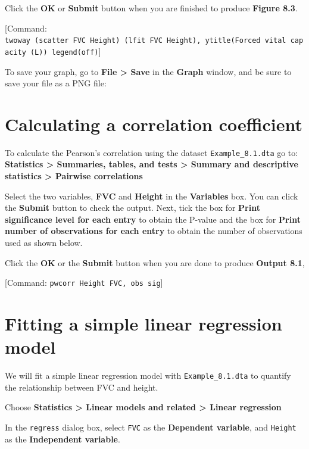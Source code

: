 \documentclass[
]{memoir}
\begin{document}
Click the \textbf{OK} or \textbf{Submit} button when you are finished to produce \textbf{Figure 8.3}.

{[}Command: \texttt{twoway\ (scatter\ FVC\ Height)\ (lfit\ FVC\ Height),\ ytitle(Forced\ vital\ capacity\ (L))\ legend(off)}{]}

To save your graph, go to \textbf{File \textgreater{} Save} in the \textbf{Graph} window, and be sure to save your file as a PNG file:

\hypertarget{calculating-a-correlation-coefficient}{%
\section{Calculating a correlation coefficient}\label{calculating-a-correlation-coefficient}}

To calculate the Pearson's correlation using the dataset \texttt{Example\_8.1.dta} go to: \textbf{Statistics \textgreater{} Summaries, tables, and tests \textgreater{} Summary and descriptive statistics \textgreater{} Pairwise correlations}

Select the two variables, \textbf{FVC} and \textbf{Height} in the \textbf{Variables} box. You can click the \textbf{Submit} button to check the output. Next, tick the box for \textbf{Print significance level for each entry} to obtain the P-value and the box for \textbf{Print number of observations for each entry} to obtain the number of observations used as shown below.

Click the \textbf{OK} or the \textbf{Submit} button when you are done to produce \textbf{Output 8.1},

{[}Command: \texttt{pwcorr\ Height\ FVC,\ obs\ sig}{]}

\hypertarget{fitting-a-simple-linear-regression-model}{%
\section{Fitting a simple linear regression model}\label{fitting-a-simple-linear-regression-model}}

We will fit a simple linear regression model with \texttt{Example\_8.1.dta} to quantify the relationship between FVC and height.

Choose \textbf{Statistics \textgreater{} Linear models and related \textgreater{} Linear regression}

In the \texttt{regress} dialog box, select \texttt{FVC} as the \textbf{Dependent variable}, and \texttt{Height} as the \textbf{Independent variable}.
\end{document}
